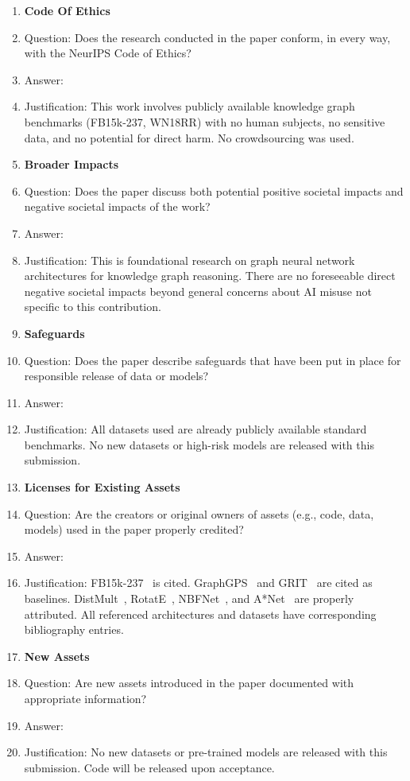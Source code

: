 \documentclass{article}
\begin{document}
\begin{enumerate}
\item {\bf Code Of Ethics}
\item[] Question: Does the research conducted in the paper conform, in every way, with the NeurIPS Code of Ethics?
\item[] Answer: \answerYes{}
\item[] Justification: This work involves publicly available knowledge graph benchmarks (FB15k-237, WN18RR) with no human subjects, no sensitive data, and no potential for direct harm. No crowdsourcing was used.

\item {\bf Broader Impacts}
\item[] Question: Does the paper discuss both potential positive societal impacts and negative societal impacts of the work?
\item[] Answer: \answerNA{}
\item[] Justification: This is foundational research on graph neural network architectures for knowledge graph reasoning. There are no foreseeable direct negative societal impacts beyond general concerns about AI misuse not specific to this contribution.

\item {\bf Safeguards}
\item[] Question: Does the paper describe safeguards that have been put in place for responsible release of data or models?
\item[] Answer: \answerNA{}
\item[] Justification: All datasets used are already publicly available standard benchmarks. No new datasets or high-risk models are released with this submission.

\item {\bf Licenses for Existing Assets}
\item[] Question: Are the creators or original owners of assets (e.g., code, data, models) used in the paper properly credited?
\item[] Answer: \answerYes{}
\item[] Justification: FB15k-237~\cite{toutanova2015representing} is cited. GraphGPS~\cite{rampavsek2022recipe} and GRIT~\cite{ma2023graph} are cited as baselines. DistMult~\cite{yang2015embedding}, RotatE~\cite{sun2019rotate}, NBFNet~\cite{zhu2021neural}, and A*Net~\cite{zhu2022astar} are properly attributed. All referenced architectures and datasets have corresponding bibliography entries.

\item {\bf New Assets}
\item[] Question: Are new assets introduced in the paper documented with appropriate information?
\item[] Answer: \answerNA{}
\item[] Justification: No new datasets or pre-trained models are released with this submission. Code will be released upon acceptance.


\end{enumerate}
\end{document}
